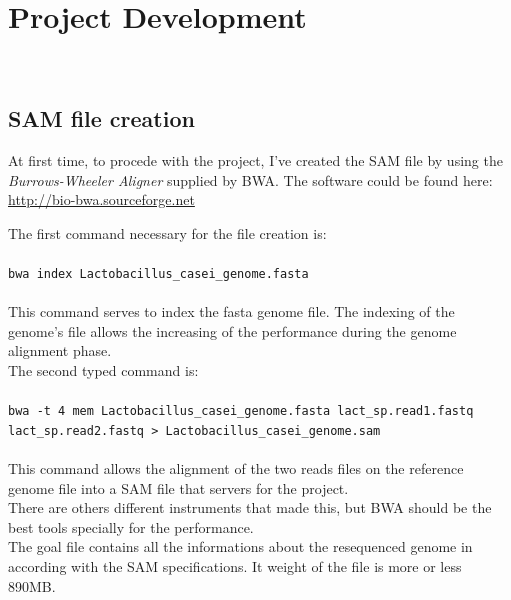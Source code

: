 
\chapter{Project Development}
\label{cap:project-development}

\\

\section{SAM file creation}
At first time, to procede with the project, I've created the SAM file by using the \emph{Burrows-Wheeler Aligner} supplied by BWA.
The software could be found here: \href{http://bio-bwa.sourceforge.net}{http://bio-bwa.sourceforge.net}

The first command necessary for the file creation is:
\\
\\
\verb|bwa index Lactobacillus_casei_genome.fasta|
\\
\\
This command serves to index the fasta genome file. The indexing of the genome's file allows the increasing of the performance during the genome alignment phase.\\

The second typed command is:
\\
\\
\verb|bwa -t 4 mem Lactobacillus_casei_genome.fasta lact_sp.read1.fastq lact_sp.read2.fastq > Lactobacillus_casei_genome.sam|
\\
\\
This command allows the alignment of the two reads files on the reference genome file into a SAM file that servers for the project.\\

There are others different instruments that made this, but BWA should be the best tools specially for the performance.\\

The goal file contains all the informations about the resequenced genome in according with the SAM specifications.
It weight of the file is more or less 890MB.
\newpage

